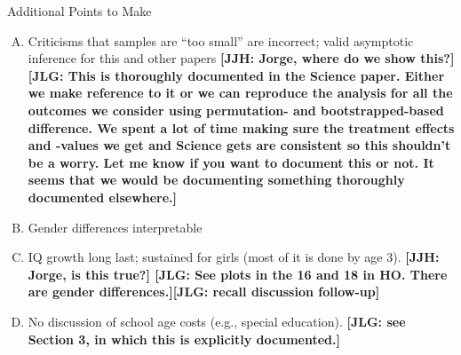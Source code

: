 \noindent Additional Points to Make
\begin{enumerate}[(A)]
\item Criticisms that samples are ``too small'' are incorrect; valid asymptotic inference for this and other papers \textbf{[JJH: Jorge, where do we show this?] [JLG: This is thoroughly documented in the Science paper. Either we make reference to it or we can reproduce the analysis for all the outcomes we consider using permutation- and bootstrapped-based difference. We spent a lot of time making sure the treatment effects and -values we get and Science gets are consistent so this shouldn't be a worry. Let me know if you want to document this or not. It seems that we would be documenting something thoroughly documented elsewhere.]}
\item Gender differences interpretable
\item IQ growth long last; sustained for girls (most of it is done by age 3). \textbf{[JJH: Jorge, is this true?] [JLG: See plots in the 16 and 18 in HO. There are gender differences.][JLG: recall discussion follow-up]}
\item No discussion of school age costs (e.g., special education). \textbf{[JLG: see Section 3, in which this is explicitly documented.]}
\end{enumerate}

